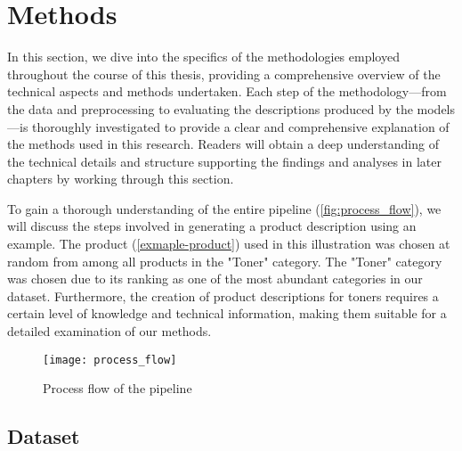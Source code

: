 \chapter{Methods}\label{chap:methods}

In this section, we dive into the specifics of the methodologies employed throughout the course of this thesis, providing a comprehensive overview of the technical aspects and methods undertaken. Each step of the methodology—from the data and preprocessing to evaluating the descriptions produced by the models—is thoroughly investigated to provide a clear and comprehensive explanation of the methods used in this research. Readers will obtain a deep understanding of the technical details and structure supporting the findings and analyses in later chapters by working through this section. 

To gain a thorough understanding of the entire pipeline (\autoref{fig:process_flow}), we will discuss the steps involved in generating a product description using an example. The product (\autoref{exmaple-product}) used in this illustration was chosen at random from among all products in the "Toner" category. The "Toner" category was chosen due to its ranking as one of the most abundant categories in our dataset. Furthermore, the creation of product descriptions for toners requires a certain level of knowledge and technical information, making them suitable for a detailed examination of our methods.

\begin{center}
	\par
\end{center}

\begin{figure}
	\centering
	\texttt{[image: process\_flow]}
	\caption{Process flow of the pipeline}
	\label{fig:process_flow}
\end{figure}

\newpage

\section{Dataset}

